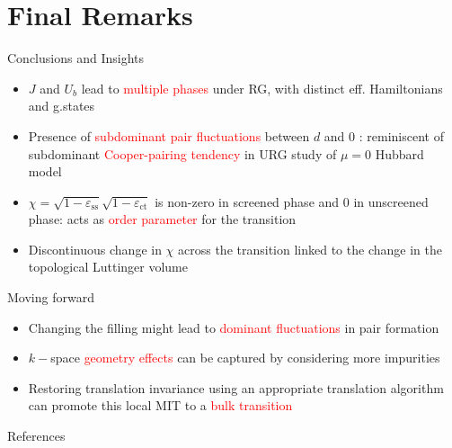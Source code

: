 \documentclass[11pt,aspectratio=169]{beamer}
\newcommand{\focus}[1]{\textcolor{red}{#1}}
\begin{document}
\section{Final Remarks}
\label{concl}

\begin{frame}{Conclusions and Insights}
\begin{itemize}
	\item \(J\) and \(U_b\) lead to \focus{multiple phases} under RG, with distinct eff. Hamiltonians and g.states\\[20pt]
	\item Presence of \focus{subdominant pair fluctuations} between \(d\) and 0 : reminiscent of subdominant \focus{Cooper-pairing tendency} in URG study of \(\mu=0\) Hubbard model\\[20pt]
	\item \(\chi = \sqrt{1-\varepsilon_\text{ss}}\sqrt{1-\varepsilon_\text{ct}}\) is non-zero in screened phase and 0 in unscreened phase: acts as \focus{order parameter} for the transition\\[20pt]
	\item Discontinuous change in \(\chi\) across the transition linked to the change in the topological Luttinger volume
\end{itemize}
\end{frame}

\begin{frame}{Moving forward}
\begin{itemize}
	\item Changing the filling might lead to \focus{dominant fluctuations} in pair formation\\[20pt]
	\item \(k-\)space \focus{geometry effects} can be captured by considering more impurities\\[20pt]
	\item Restoring translation invariance using an appropriate translation algorithm can promote this local MIT to a \focus{bulk transition}
\end{itemize}
\end{frame}

\begin{frame}[allowframebreaks]{References}
\printbibliography
\end{frame}
\end{document}
